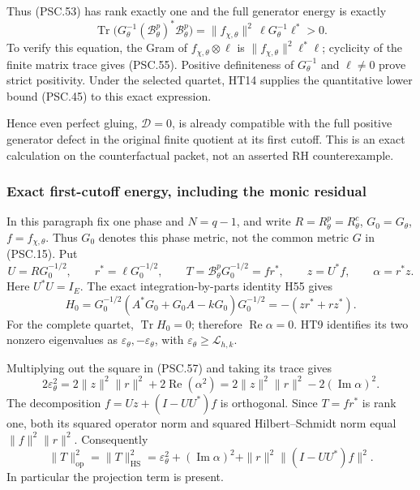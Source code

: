 Thus (PSC.53) has rank exactly one and the full generator energy is exactly
\[
 \operatorname{Tr}\bigl(
    G_\theta^{-1}(\mathscr B^p_\theta)^*\mathscr B^p_\theta\bigr)
 =\|f_{\chi,\theta}\|^2\,\ell G_\theta^{-1}\ell^*>0.
 \tag{PSC.55}
\]
To verify this equation, the Gram of \(f_{\chi,\theta}\otimes\ell\) is
\(\|f_{\chi,\theta}\|^2\ell^*\ell\); cyclicity of the finite matrix trace gives (PSC.55). Positive definiteness of \(G_\theta^{-1}\) and \(\ell\ne0\) prove strict positivity. Under the selected quartet, HT14 supplies the quantitative lower bound (PSC.45) to this exact expression.

Hence even perfect gluing, \(\mathscr D=0\), is already compatible with the full positive generator defect in the original finite quotient at its first cutoff. This is an exact calculation on the counterfactual packet, not an asserted RH counterexample.

\subsubsection{Exact first-cutoff energy, including the monic residual}

In this paragraph fix one phase and \(N=q-1\), and write
\(R=R^p_\theta=R^c_\theta\), \(G_0=G_\theta\),
\(f=f_{\chi,\theta}\). Thus \(G_0\) denotes this phase metric, not the common metric \(G\) in (PSC.15). Put
\[
 U=RG_0^{-1/2},\qquad
 r^*=\ell G_0^{-1/2},\qquad
 T=\mathscr B^p_\theta G_0^{-1/2}=fr^*,\qquad
 z=U^*f,\qquad \alpha=r^*z.
 \tag{PSC.56}
\]
Here \(U^*U=I_E\). The exact integration-by-parts identity H55 gives
\[
 H_0=G_0^{-1/2}(A^*G_0+G_0A-kG_0)G_0^{-1/2}
 =-(zr^*+rz^*).
 \tag{PSC.57}
\]
For the complete quartet, \(\operatorname{Tr}H_0=0\); therefore
\(\operatorname{Re}\alpha=0\). HT9 identifies its two nonzero eigenvalues as \(\varepsilon_\theta,-\varepsilon_\theta\), with \(\varepsilon_\theta\geq\mathcal L_{h,k}\).

Multiplying out the square in (PSC.57) and taking its trace gives
\[
 2\varepsilon_\theta^2
 =2\|z\|^2\|r\|^2+2\operatorname{Re}(\alpha^2)
 =2\|z\|^2\|r\|^2-2(\operatorname{Im}\alpha)^2.
 \]
The decomposition \(f=Uz+(I-UU^*)f\) is orthogonal. Since \(T=fr^*\) is rank one, both its squared operator norm and squared Hilbert–Schmidt norm equal \(\|f\|^2\|r\|^2\). Consequently
\[
 \boxed{
 \|T\|_{\mathrm{op}}^2=\|T\|_{\mathrm{HS}}^2
 =\varepsilon_\theta^2+(\operatorname{Im}\alpha)^2
     +\|r\|^2\|(I-UU^*)f\|^2.}
 \tag{PSC.58}
\]
In particular the projection term is present.

